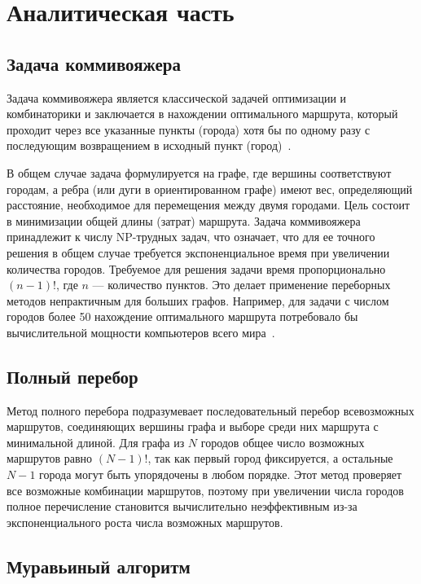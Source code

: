 \chapter{Аналитическая часть}

\section{Задача коммивояжера}

Задача коммивояжера является классической задачей оптимизации и комбинаторики и заключается в нахождении оптимального маршрута, который проходит через все указанные пункты (города) хотя бы по одному разу с последующим возвращением в исходный пункт (город)~\cite{lit1}.

В общем случае задача формулируется на графе, где вершины соответствуют городам, а ребра (или дуги в ориентированном графе) имеют вес, определяющий расстояние, необходимое для перемещения между двумя городами. Цель состоит в минимизации общей длины (затрат) маршрута.
Задача коммивояжера принадлежит к числу NP-трудных задач, что означает, что для ее точного решения в общем случае требуется экспоненциальное время при увеличении количества городов. Требуемое для решения задачи время пропорционально \((n-1)!\), где \(n\) --- количество пунктов. Это делает применение переборных методов непрактичным для больших графов. Например, для задачи с числом городов более 50 нахождение оптимального маршрута потребовало бы вычислительной мощности компьютеров всего мира~\cite{lit1}.

\section{Полный перебор}

Метод полного перебора подразумевает последовательный перебор всевозможных маршрутов, соединяющих вершины графа и выборе среди них маршрута с минимальной длиной. Для графа из \(N\) городов общее число возможных маршрутов равно \((N-1)!\), так как первый город фиксируется, а остальные \(N-1\) города могут быть упорядочены в любом порядке.
Этот метод проверяет все возможные комбинации маршрутов, поэтому при увеличении числа городов полное перечисление становится вычислительно неэффективным из-за экспоненциального роста числа возможных маршрутов.

\section{Муравьиный алгоритм}

